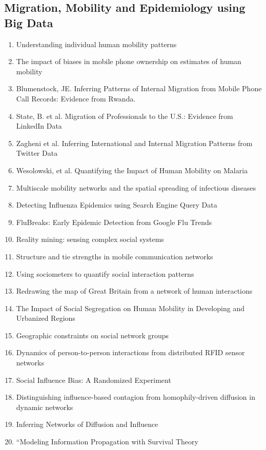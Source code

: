 \subsection{Migration, Mobility and Epidemiology using Big Data}
\begin{enumerate}
\item Understanding individual human mobility patterns\cite{Gonz_lez_2008}
\item The impact of biases in mobile phone ownership on estimates of human mobility
\item Blumenstock, JE. Inferring Patterns of Internal Migration from Mobile Phone Call Records: Evidence from Rwanda. 
\item State, B. et al. Migration of Professionals to the U.S.: Evidence from LinkedIn Data
\item Zagheni et al. Inferring International and Internal Migration Patterns from Twitter Data
\item Wesolowski, et al. Quantifying the Impact of Human Mobility on Malaria \cite{Wesolowski_2012}
\item Multiscale mobility networks and the spatial spreading of infectious diseases
\item  Detecting Influenza Epidemics using Search Engine Query Data
\item FluBreaks: Early Epidemic Detection from Google Flu Trends
\item Reality mining: sensing complex social systems
\item Structure and tie strengths in mobile communication networks
\item Using sociometers to quantify social interaction patterns
\item Redrawing the map of Great Britain from a network of human interactions
\item The Impact of Social Segregation on Human Mobility in Developing and Urbanized Regions
\item Geographic constraints on social network groups
\item Dynamics of person-to-person interactions from distributed RFID sensor networks
\item Social Influence Bias: A Randomized Experiment
\item Distinguishing influence-based contagion from homophily-driven diffusion in dynamic networks
\item Inferring Networks of Diffusion and Influence
\item “Modeling Information Propagation with Survival Theory

\end{enumerate}
